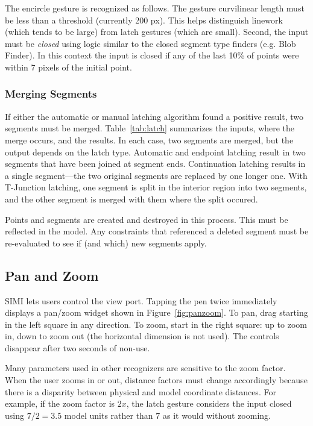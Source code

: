 The encircle gesture is recognized as follows. The gesture curvilinear
length must be less than a threshold (currently 200 px). This helps
distinguish linework (which tends to be large) from latch gestures
(which are small). Second, the input must be \textit{closed} using
logic similar to the closed segment type finders (e.g. Blob
Finder). In this context the input is closed if any of the last 10\%
of points were within 7 pixels of the initial point.

\subsubsection{Merging Segments}



If either the automatic or manual latching algorithm found a positive
result, two segments must be merged. Table~\ref{tab:latch} summarizes
the inputs, where the merge occurs, and the results. In each case, two
segments are merged, but the output depends on the latch
type. Automatic and endpoint latching result in two segments that have
been joined at segment ends. Continuation latching results in a single
segment---the two original segments are replaced by one longer
one. With T-Junction latching, one segment is split in the interior
region into two segments, and the other segment is merged with them
where the split occured.

Points and segments are created and destroyed in this process. This
must be reflected in the model. Any constraints that referenced a
deleted segment must be re-evaluated to see if (and which) new
segments apply.

\subsection{Pan and Zoom}

SIMI lets users control the view port. Tapping the pen twice
immediately displays a pan/zoom widget shown in
Figure~\ref{fig:panzoom}. To pan, drag starting in the left square in
any direction. To zoom, start in the right square: up to zoom in, down
to zoom out (the horizontal dimension is not used). The controls
disappear after two seconds of non-use.

Many parameters used in other recognizers are sensitive to the zoom
factor. When the user zooms in or out, distance factors must change
accordingly because there is a disparity between physical and model
coordinate distances. For example, if the zoom factor is $2x$, the
latch gesture considers the input closed using $7/2=3.5$ model
units rather than $7$ as it would without zooming.

